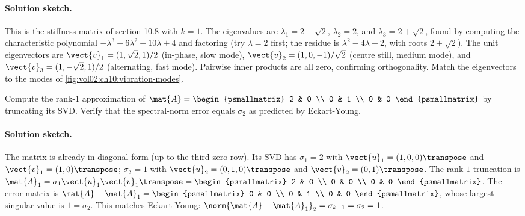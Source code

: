 \paragraph{Solution sketch.}
This is the stiffness matrix of section 10.8 with $k = 1$. The
eigenvalues are $\lambda_{1} = 2 - \sqrt{2}$, $\lambda_{2} = 2$, and
$\lambda_{3} = 2 + \sqrt{2}$, found by computing the characteristic
polynomial $-\lambda^{3} + 6\lambda^{2} - 10\lambda + 4$ and
factoring (try $\lambda = 2$ first; the residue is $\lambda^{2} -
4\lambda + 2$, with roots $2 \pm \sqrt{2}$). The unit eigenvectors
are $\vect{v}_{1} = (1, \sqrt{2}, 1)/2$ (in-phase, slow mode),
$\vect{v}_{2} = (1, 0, -1)/\sqrt{2}$ (centre still, medium mode),
and $\vect{v}_{3} = (1, -\sqrt{2}, 1)/2$ (alternating, fast mode).
Pairwise inner products are all zero, confirming orthogonality.
Match the eigenvectors to the modes of \cref{fig:vol02:ch10:vibration-modes}.

\begin{exercise}
Compute the rank-$1$ approximation of $\mat{A} =
\begin{psmallmatrix} 2 & 0 \\ 0 & 1 \\ 0 & 0 \end{psmallmatrix}$ by
truncating its SVD. Verify that the spectral-norm error equals
$\sigma_{2}$ as predicted by Eckart-Young.
\end{exercise}

\paragraph{Solution sketch.}
The matrix is already in diagonal form (up to the third zero row).
Its SVD has $\sigma_{1} = 2$ with $\vect{u}_{1} = (1, 0, 0)\transpose$
and $\vect{v}_{1} = (1, 0)\transpose$; $\sigma_{2} = 1$ with
$\vect{u}_{2} = (0, 1, 0)\transpose$ and $\vect{v}_{2} = (0, 1)
\transpose$. The rank-$1$ truncation is $\mat{A}_{1} = \sigma_{1}
\vect{u}_{1} \vect{v}_{1}\transpose = \begin{psmallmatrix} 2 & 0 \\
0 & 0 \\ 0 & 0 \end{psmallmatrix}$. The error matrix is
$\mat{A} - \mat{A}_{1} = \begin{psmallmatrix} 0 & 0 \\ 0 & 1 \\ 0 & 0
\end{psmallmatrix}$, whose largest singular value is $1 = \sigma_{2}$.
This matches Eckart-Young: $\norm{\mat{A} - \mat{A}_{1}}_{2} =
\sigma_{k+1} = \sigma_{2} = 1$.


